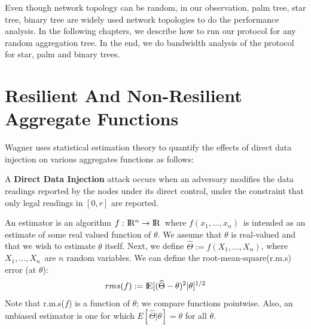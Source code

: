 	Even though network topology can be random, in our observation, palm tree, star tree, binary tree are widely used network topologies to do the performance analysis.
	In the following chapters, we describe how to run our protocol for any random aggregation tree.
	In the end, we do bandwidth analysis of the protocol for star, palm and binary trees.

\section{Resilient And Non-Resilient Aggregate Functions}
	
	Wagner \cite{wagner2004resilient} uses statistical estimation theory to quantify the effects of direct data injection on various aggregates functions as follows:

	\begin{definition}
		\label{def:direct-data-injection}
		\cite{chan2006secure} A \textbf{Direct Data Injection} attack occurs when an adversary modifies the data readings reported by the nodes under its direct control, under the constraint that only legal readings in $[0, r]$ are reported.
	\end{definition}
	An estimator is an algorithm $ f :\ \R^n \rightarrow \rm I\!R$\ where $f(x_{1},\dotsc, x_{n})$\ is intended as an estimate of some real valued function of $\theta$.
	We assume that $\theta$ is real-valued and that we wish to estimate $\theta$ itself.
	Next, we define $\widehat{\Theta} := f(X_{1},\dotsc,X_{n})$, where $X_{1},\dotsc,X_{n}$\ are $n$ random variables. We can define the root-mean-square(r.m.s)  error (at $\theta$):
	\begin{equation}
		rms(f) := \rm I\!E[(\widehat{\Theta} - \theta)^2 | \theta]^{1/2}
	\end{equation}
	Note that r.m.s($f$) is a function of $\theta$; we compare functions pointwise. 
	Also, an unbiased estimator is one for which $E[\widehat{\Theta} | \theta] = \theta $ for all $\theta$.


